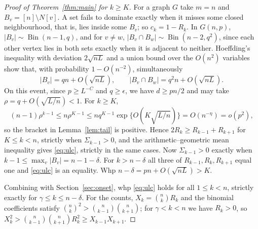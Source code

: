 \documentclass[11pt]{article}
\theoremstyle{remark}
\begin{document}
\begin{proof}[Proof of Theorem~\ref{thm:main} for $k\ge K$]
For a graph $G$ take $m=n$ and $B_v=[n]\setminus N[v]$. A set fails to dominate exactly when it misses some closed neighbourhood, that is, lies inside some $B_v$; so $c_k=1-R_k$. In $G(n,p)$, $|B_v|\sim\operatorname{Bin}(n-1,q)$, and for $v\ne w$, $|B_v\cap B_w|\sim\operatorname{Bin}(n-2,q^2)$, since each other vertex lies in both sets exactly when it is adjacent to neither. Hoeffding's inequality with deviation $2\sqrt{nL}$ and a union bound over the $O(n^2)$ variables show that, with probability $1-O(n^{-2})$, simultaneously
\[
 |B_v|=qn+O(\sqrt{nL}),\qquad |B_v\cap B_w|=q^2n+O(\sqrt{nL}).
\]
On this event, since $p\ge L^{-C}$ and $q\ge\epsilon$, we have $d\ge pn/2$ and may take $\rho=q+O(\sqrt{L/n})<1$. For $k\ge K$,
\[
 (n-1)\rho^{k-1}\le n\rho^{K-1}
 \le nq^{K-1}\exp\{O(K\sqrt{L/n})\}=O(n^{-\eta})=o(p^2),
\]
so the bracket in Lemma~\ref{lem:tail} is positive. Hence $2R_k\ge R_{k-1}+R_{k+1}$ for $K\le k<n$, strictly when $\Sigma_{k-1}>0$, and the arithmetic--geometric mean inequality gives \eqref{eq:ulc}, strictly in the same cases. Now $\Sigma_{k-1}>0$ exactly when $k-1\le\max_v|B_v|=n-1-\delta$. For $k>n-\delta$ all three of $R_{k-1},R_k,R_{k+1}$ equal one and \eqref{eq:ulc} is an equality. Whp $n-\delta=pn+O(\sqrt{nL})>K$.

Combining with Section~\ref{sec:onset}, whp \eqref{eq:ulc} holds for all $1\le k<n$, strictly exactly for $\gamma\le k\le n-\delta$. For the counts, $X_k=\binom nkR_k$ and the binomial coefficients satisfy $\binom nk^2>\binom n{k-1}\binom n{k+1}$; for $\gamma<k<n$ we have $R_k>0$, so $X_k^2>\binom n{k-1}\binom n{k+1}R_k^2\ge X_{k-1}X_{k+1}$.
\end{proof}
\end{document}
